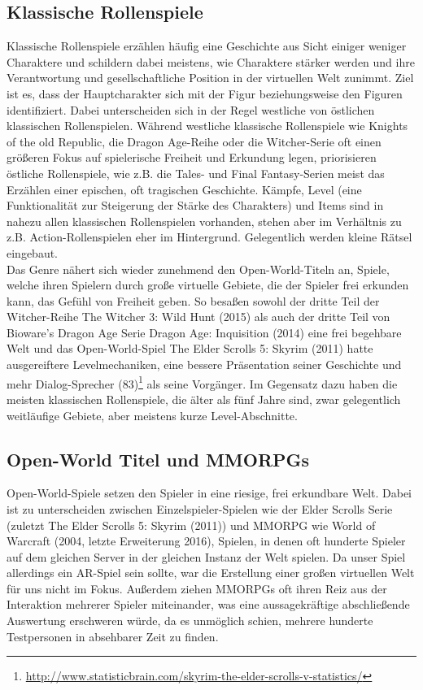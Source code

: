 \documentclass[extern,palatino]{cgBA}
\begin{document}
	\subsection{Klassische Rollenspiele}
	Klassische Rollenspiele erzählen häufig eine Geschichte aus Sicht einiger weniger Charaktere und schildern dabei meistens, wie Charaktere stärker werden und ihre Verantwortung und gesellschaftliche Position in der virtuellen Welt zunimmt. Ziel ist es, dass der Hauptcharakter sich mit der Figur beziehungsweise den Figuren identifiziert. Dabei unterscheiden sich in der Regel westliche von östlichen klassischen Rollenspielen. Während westliche klassische Rollenspiele wie Knights of the old Republic, die Dragon Age-Reihe oder die Witcher-Serie oft einen größeren Fokus auf spielerische Freiheit und Erkundung legen, priorisieren östliche Rollenspiele, wie z.B. die Tales- und Final Fantasy-Serien meist das Erzählen einer epischen, oft tragischen Geschichte.
	Kämpfe, Level (eine Funktionalität zur Steigerung der Stärke des Charakters) und Items sind in nahezu allen klassischen Rollenspielen vorhanden, stehen aber im Verhältnis zu z.B. Action-Rollenspielen eher im Hintergrund. Gelegentlich werden kleine Rätsel eingebaut.
	\\Das Genre nähert sich wieder zunehmend den Open-World-Titeln an, Spiele, welche ihren Spielern durch große virtuelle Gebiete, die der Spieler frei erkunden kann, das Gefühl von Freiheit geben. So besaßen sowohl der dritte Teil der Witcher-Reihe The Witcher 3: Wild Hunt (2015) als auch der dritte Teil von Bioware's Dragon Age Serie Dragon Age: Inquisition (2014) eine frei begehbare Welt und das Open-World-Spiel The Elder Scrolls 5: Skyrim (2011) hatte ausgereiftere Levelmechaniken, eine bessere Präsentation seiner Geschichte und mehr Dialog-Sprecher (83)\footnote{\url{http://www.statisticbrain.com/skyrim-the-elder-scrolls-v-statistics/}} als seine Vorgänger. Im Gegensatz dazu haben die meisten klassischen Rollenspiele, die älter als fünf Jahre sind, zwar gelegentlich weitläufige Gebiete, aber meistens kurze Level-Abschnitte. %
	
	\subsection{Open-World Titel und MMORPGs}
	Open-World-Spiele setzen den Spieler in eine riesige, frei erkundbare Welt. Dabei ist zu unterscheiden zwischen Einzelspieler-Spielen wie der Elder Scrolls Serie (zuletzt The Elder Scrolls 5: Skyrim (2011)) und MMORPG wie World of Warcraft (2004, letzte Erweiterung 2016), Spielen, in denen oft hunderte Spieler auf dem gleichen Server in der gleichen Instanz der Welt spielen. Da unser Spiel allerdings ein AR-Spiel sein sollte, war die Erstellung einer großen virtuellen Welt für uns nicht im Fokus. Außerdem ziehen MMORPGs oft ihren Reiz aus der Interaktion mehrerer Spieler miteinander, was eine aussagekräftige abschließende Auswertung erschweren würde, da es unmöglich schien, mehrere hunderte Testpersonen in absehbarer Zeit zu finden.
\end{document}
